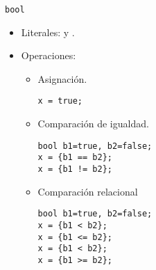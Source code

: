 \begin{frame}[fragile]{\texttt{bool}}
\begin{itemize}
  \item Literales:  y .
  \item Operaciones:
    \begin{itemize}
      \item Asignación.
\begin{lstlisting}
x = true;
\end{lstlisting}
      \item Comparación de igualdad.
\begin{lstlisting}
bool b1=true, b2=false;
x = {b1 == b2};
x = {b1 != b2};
\end{lstlisting}
      \item Comparación relacional
\begin{lstlisting}
bool b1=true, b2=false;
x = {b1 < b2};
x = {b1 <= b2};
x = {b1 < b2};
x = {b1 >= b2};
\end{lstlisting}
    \end{itemize}
\end{itemize}
\end{frame}

